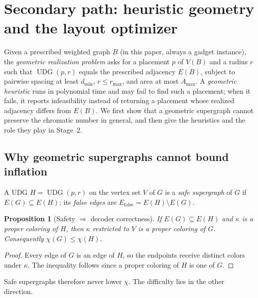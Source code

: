 \documentclass[a4paper,fleqn]{cas-sc}
\newtheorem{proposition}[theorem]{Proposition}
\newcommand{\UDG}{\operatorname{UDG}}
\newcommand{\Efalse}{E_{\mathrm{false}}}
\begin{document}
\section{Secondary path: heuristic geometry and the layout optimizer}
\label{sec:heuristics}

Given a prescribed weighted graph $B$ (in this paper, always a gadget instance), the
\emph{geometric realization problem} asks for a placement $p$ of $V(B)$ and a radius
$r$ such that $\UDG(p,r)$ equals the prescribed adjacency $E(B)$, subject to pairwise
spacing at least $d_{\min}$, $r\le r_{\max}$, and area at most $A_{\max}$. A
\emph{geometric heuristic} runs in polynomial time and may fail to find such a
placement; when it fails, it reports infeasibility instead of returning a placement
whose realized adjacency differs from $E(B)$. We first show that a geometric
supergraph cannot preserve the chromatic number in general, and then give the
heuristics and the role they play in Stage~2.

\subsection{Why geometric supergraphs cannot bound inflation}
\label{sec:impossibility}

\begin{definition}
\label{def:safesuper}
A UDG $H=\UDG(p,r)$ on the vertex set $V$ of $G$ is a \emph{safe supergraph} of $G$ if
$E(G)\subseteq E(H)$; its \emph{false edges} are $\Efalse=E(H)\setminus E(G)$.
\end{definition}

\begin{proposition}[Safety $\Rightarrow$ decoder correctness]
\label{prop:safety}
If $E(G)\subseteq E(H)$ and $\kappa$ is a proper coloring of $H$, then $\kappa$
restricted to $V$ is a proper coloring of $G$. Consequently
$\chi(G)\le\chi(H)$.
\end{proposition}

\begin{proof}
Every edge of $G$ is an edge of $H$, so the endpoints receive distinct colors
under $\kappa$. The inequality follows since a proper coloring of $H$ is one of
$G$.
\end{proof}

Safe supergraphs therefore never lower $\chi$. The difficulty lies in the other
direction.
\end{document}
